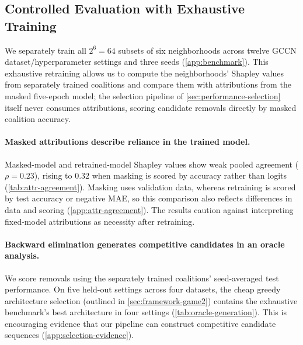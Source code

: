 \subsection{Controlled Evaluation with Exhaustive Training}
\label{sec:performance-controlled}

We separately train all $2^6=64$ subsets of six neighborhoods across twelve GCCN dataset/hyperparameter settings and three seeds (\cref{app:benchmark}). This exhaustive retraining allows us to compute the neighborhoods' Shapley values from separately trained coalitions and compare them with attributions from the masked five-epoch model; the selection pipeline of \cref{sec:performance-selection} itself never consumes attributions, scoring candidate removals directly by masked coalition accuracy.

\paragraph{Masked attributions describe reliance in the trained model.}
Masked-model and retrained-model Shapley values show weak pooled agreement ($\rho=0.23$), rising to $0.32$ when masking is scored by accuracy rather than logits (\cref{tab:attr-agreement}). Masking uses validation data, whereas retraining is scored by test accuracy or negative MAE, so this comparison also reflects differences in data and scoring (\cref{app:attr-agreement}). The results caution against interpreting fixed-model attributions as necessity after retraining. %

\paragraph{Backward elimination generates competitive candidates in an oracle analysis.}
We score removals using the separately trained coalitions' seed-averaged test performance. On five held-out settings across four datasets, the cheap greedy architecture selection (outlined in \cref{sec:framework-game2}) contains the exhaustive benchmark's best architecture in four settings (\cref{tab:oracle-generation}). This is encouraging evidence that our pipeline can construct competitive candidate sequences (\cref{app:selection-evidence}).




